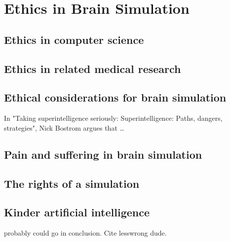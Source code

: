\section{Ethics in Brain Simulation}

\subsection{Ethics in computer science}


\subsection{Ethics in related medical research}


\subsection{Ethical considerations for brain simulation}

In "Taking superintelligence seriously: Superintelligence: Paths, dangers,
strategies", Nick Bostrom argues that \ldots
\autocite{bostrom_superintelligence_2014}

\subsection{Pain and suffering in brain simulation}

\subsection{The rights of a simulation}

\subsection{Kinder artificial intelligence}
probably could go in conclusion. Cite lesswrong dude.

